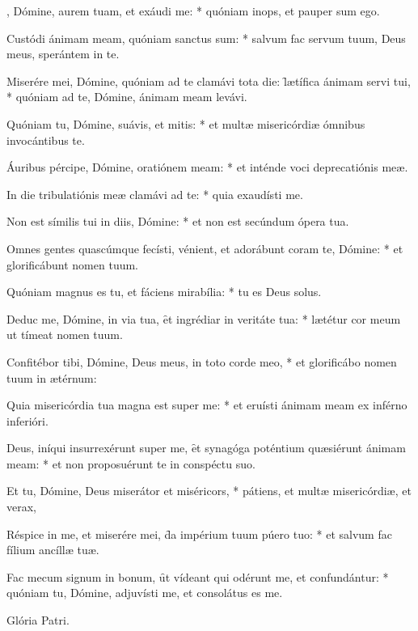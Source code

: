 \begin{psalmus}

    , Dómine, aurem tuam, et exáudi me: * quóniam inops, et pauper sum ego.

    Custódi ánimam meam, quóniam sanctus sum: * salvum fac servum tuum, Deus meus, sperántem in te.

    Miserére mei, Dómine, quóniam ad te clamávi tota die: \f lætífica ánimam servi tui, * quóniam ad te, Dómine, ánimam meam levávi.

    Quóniam tu, Dómine, suávis, et mitis: * et multæ misericórdiæ ómnibus invocántibus te.

    Áuribus pércipe, Dómine, oratiónem meam: * et inténde voci deprecatiónis meæ.

    In die tribulatiónis meæ clamávi ad te: * quia exaudísti me.

    Non est símilis tui in diis, Dómine: * et non est secúndum ópera tua.

    Omnes gentes quascúmque fecísti, vénient, et adorábunt coram te, Dómine: * et glorificábunt nomen tuum.

    Quóniam magnus es tu, et fáciens mirabília: * tu es Deus solus.

    Deduc me, Dómine, in via tua, \f et ingrédiar in veritáte tua: * lætétur cor meum ut tímeat nomen tuum.

    Confitébor tibi, Dómine, Deus meus, in toto corde meo, * et glorificábo nomen tuum in ætérnum:

    Quia misericórdia tua magna est super me: * et eruísti ánimam meam ex inférno inferióri.

    Deus, iníqui insurrexérunt super me, \f et synagóga poténtium quæsiérunt ánimam meam: * et non proposuérunt te in conspéctu suo.

    Et tu, Dómine, Deus miserátor et miséricors, * pátiens, et multæ misericórdiæ, et verax,

    Réspice in me, et miserére mei, \f da impérium tuum púero tuo: * et salvum fac fílium ancíllæ tuæ.

    Fac mecum signum in bonum, \f ut vídeant qui odérunt me, et confundántur: * quóniam tu, Dómine, adjuvísti me, et consolátus es me.

		Glória Patri.

\end{psalmus}
